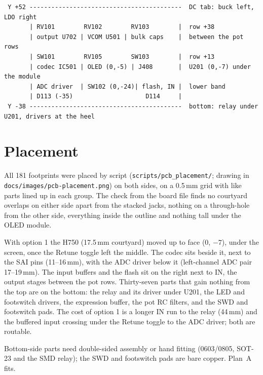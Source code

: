{\footnotesize
\begin{verbatim}
 Y +52 ------------------------------------------  DC tab: buck left, LDO right
       | RV101        RV102        RV103        |  row +38
       | output U702 | VCOM U501 | bulk caps    |  between the pot rows
       | SW101        RV105        SW103        |  row +13
       | codec IC501 | OLED (0,-5) | J408       |  U201 (0,-7) under the module
       | ADC driver  | SW102 (0,-24)| flash, IN |  lower band
       | D113 (-35)                    D114     |
 Y -38 ------------------------------------------  bottom: relay under U201, drivers at the heel
\end{verbatim}
}

\section{Placement}
All 181 footprints were placed by script (\texttt{scripts/pcb\_placement/}; drawing in \texttt{docs/images/pcb-placement.png}) on both sides, on a 0.5\,mm grid with like parts lined up in each group. The check from the board file finds no courtyard overlaps on either side apart from the stacked jacks, nothing on a through-hole from the other side, everything inside the outline and nothing tall under the OLED module.

With option 1 the H750 (17.5\,mm courtyard) moved up to face (0, $-7$), under the screen, once the Retune toggle left the middle. The codec sits beside it, next to the SAI pins (11--16\,mm), with the ADC driver below it (left-channel ADC pair 17--19\,mm). The input buffers and the flash sit on the right next to IN, the output stages between the pot rows. Thirty-seven parts that gain nothing from the top are on the bottom: the relay and its driver under U201, the LED and footswitch drivers, the expression buffer, the pot RC filters, and the SWD and footswitch pads. The cost of option 1 is a longer IN run to the relay (44\,mm) and the buffered input crossing under the Retune toggle to the ADC driver; both are routable.

Bottom-side parts need double-sided assembly or hand fitting (0603/0805, SOT-23 and the SMD relay); the SWD and footswitch pads are bare copper. Plan~A fits.

